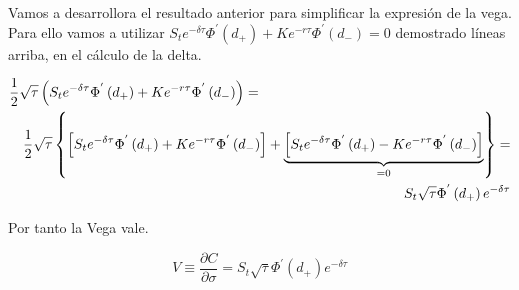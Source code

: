 \documentclass[12pt]{article}
\begin{document}
Vamos a desarrollora el resultado anterior para simplificar la expresi\'{o}n de la vega. Para ello vamos a utilizar
$S_{t}e^{-\delta\tau}\Phi^{'}\left(d_{+}\right)+Ke^{-r\tau}\Phi^{'}\left(d_{-}\right) = 0$ demostrado l\'{i}neas arriba, en el c\'{a}lculo
de la delta.
\newline

\begin{eqnarray}
	\lefteqn{\frac{1}{2}\sqrt{\tau}\left(S_{t}e^{-\delta\tau}\Phi^{'}\left(d_{+}\right) + 
	Ke^{-r\tau}\Phi^{'}\left(d_{-}\right)\right) = } \nonumber \\
	 & & \frac{1}{2}\sqrt{\tau}\left\{\left[S_{t} e^{-\delta\tau}\Phi^{'}\left(d_{+}\right) + 
	Ke^{-r\tau}\Phi^{'}\left(d_{-}\right)\right] + \underbrace{\left[S_{t} e^{-\delta\tau}\Phi^{'}\left(d_{+}\right) -
	Ke^{-r\tau}\Phi^{'}\left(d_{-}\right)\right]}_{=0}\right\} = \nonumber \\
	 & & S_{t}\sqrt{\tau}\Phi^{'}\left(d_{+}\right)e^{-\delta\tau} \nonumber
\end{eqnarray}
\newline

Por tanto la Vega vale.
\newline

\begin{equation}
	V \equiv \frac{\partial C}{\partial\sigma} = S_{t}\sqrt{\tau}\Phi^{'}\left(d_{+}\right)e^{-\delta\tau}
\end{equation}
 
\end{document}
